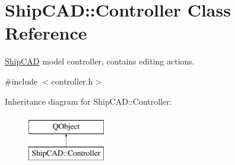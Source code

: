 \hypertarget{classShipCAD_1_1Controller}{\section{Ship\-C\-A\-D\-:\-:Controller Class Reference}
\label{classShipCAD_1_1Controller}
}


\hyperlink{namespaceShipCAD}{Ship\-C\-A\-D} model controller, contains editing actions.  




{\ttfamily \#include $<$controller.\-h$>$}

Inheritance diagram for Ship\-C\-A\-D\-:\-:Controller\-:\begin{figure}[H]
\begin{center}
\leavevmode
\includegraphics[height=2.000000cm]{classShipCAD_1_1Controller}
\end{center}
\end{figure}

